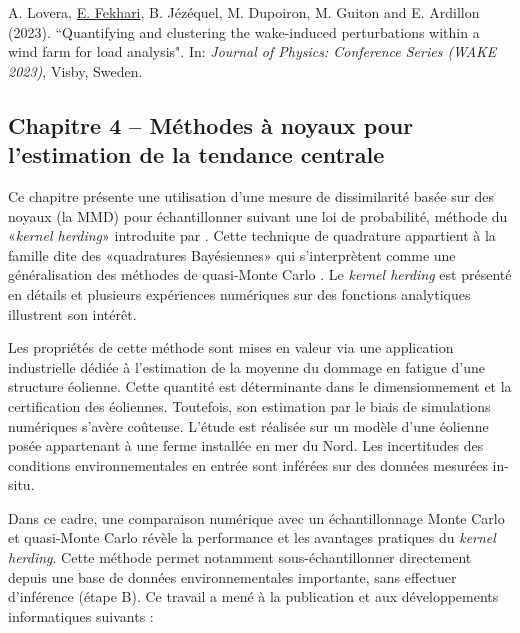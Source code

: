 \medskip
\noindent
{} A. Lovera, \underline{E. Fekhari}, B. J\'{e}z\'{e}quel, M. Dupoiron, M. Guiton and E. Ardillon (2023). ``Quantifying and clustering the wake-induced perturbations within a wind farm for load analysis". In: \textit{Journal of Physics: Conference Series (WAKE 2023)}, Visby, Sweden.
 

\subsection*{Chapitre 4 -- M\'{e}thodes à noyaux pour l'estimation de la tendance centrale}

Ce chapitre pr\'{e}sente une utilisation d'une mesure de dissimilarit\'{e} bas\'{e}e sur des noyaux (la MMD) pour \'{e}chantillonner suivant une loi de probabilit\'{e}, m\'{e}thode du «\textit{kernel herding}» introduite par \citet{chen_welling_2010}. 
Cette technique de quadrature appartient à la famille dite des «quadratures Bay\'{e}siennes» \citep{briol_oates_2019} qui s'interprètent comme une g\'{e}n\'{e}ralisation des m\'{e}thodes de quasi-Monte Carlo \citep{hickernell_2020}. 
Le \textit{kernel herding} est pr\'{e}sent\'{e} en d\'{e}tails et plusieurs exp\'{e}riences num\'{e}riques sur des fonctions analytiques illustrent son int\'{e}rêt. 

Les propri\'{e}t\'{e}s de cette m\'{e}thode sont mises en valeur via une application industrielle d\'{e}di\'{e}e à l'estimation de la moyenne du dommage en fatigue d'une structure \'{e}olienne. 
Cette quantit\'{e} est d\'{e}terminante dans le dimensionnement et la certification des \'{e}oliennes. 
Toutefois, son estimation par le biais de simulations num\'{e}riques s'avère coûteuse. 
L'\'{e}tude est r\'{e}alis\'{e}e sur un modèle d'une \'{e}olienne pos\'{e}e appartenant à une ferme install\'{e}e en mer du Nord. 
Les incertitudes des conditions environnementales en entr\'{e}e sont inf\'{e}r\'{e}es sur des donn\'{e}es mesur\'{e}es in-situ. 

Dans ce cadre, une comparaison num\'{e}rique avec un \'{e}chantillonnage Monte Carlo et quasi-Monte Carlo r\'{e}vèle la performance et les avantages pratiques du \textit{kernel herding}.
Cette m\'{e}thode permet notamment sous-\'{e}chantillonner directement depuis une base de donn\'{e}es environnementales importante, sans effectuer d'inf\'{e}rence (\'{e}tape B). 
Ce travail a men\'{e} à la publication et aux d\'{e}veloppements informatiques suivants : 


